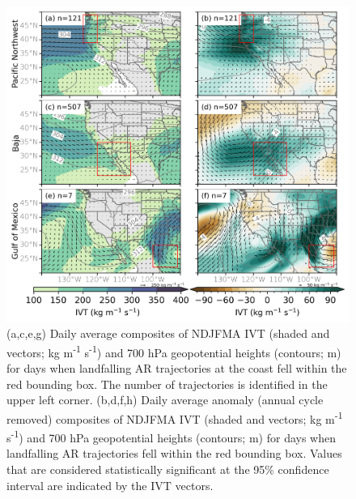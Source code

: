 \documentclass[draft]{agujournal2019}
\begin{document}
\begin{figure}
\noindent\includegraphics[width=\textwidth, height=\textheight, keepaspectratio]{fig5.png}

\caption{(a,c,e,g) Daily average composites of NDJFMA IVT (shaded and vectors; kg m\textsuperscript{-1} s\textsuperscript{-1}) and 700 hPa geopotential heights (contours; m) for days when landfalling AR trajectories at the coast fell within the red bounding box. The number of trajectories is identified in the upper left corner. (b,d,f,h) Daily average anomaly (annual cycle removed) composites of NDJFMA IVT (shaded and vectors; kg m\textsuperscript{-1} s\textsuperscript{-1}) and 700 hPa geopotential heights (contours; m) for days when landfalling AR trajectories fell within the red bounding box. Values that are considered statistically significant at the 95\% confidence interval are indicated by the IVT vectors.}
\label{fig:composites_NDJFMA}
\end{figure}
\end{document}
